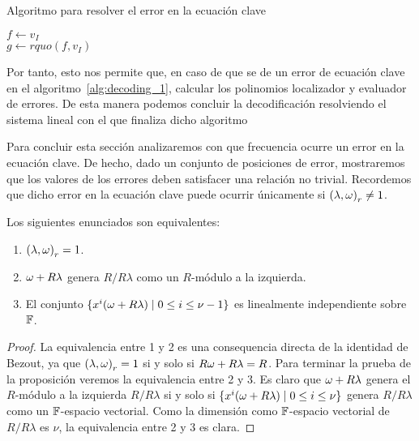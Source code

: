 \begin{algorithm}[H]
 \label{alg:failure_solver}
 \caption{Algoritmo para resolver el error en la ecuación clave}
 \(f \gets v_I\)\\
\(g \gets rquo(f, v_I)\)\\
\end{algorithm}

Por tanto, esto nos permite que, en caso de que se de un error de ecuación clave en el algoritmo~\ref{alg:decoding_1}, calcular los polinomios localizador y evaluador de errores. De esta manera podemos concluir la decodificación resolviendo el sistema lineal con el que finaliza dicho algoritmo

Para concluir esta sección analizaremos con que frecuencia ocurre un error en la ecuación clave. De hecho, dado un conjunto de posiciones de error, mostraremos que los valores de los errores deben satisfacer una relación no trivial. Recordemos que dicho error en la ecuación clave puede ocurrir únicamente si \({(\lambda, \omega)}_r \neq 1\).

\begin{proposition}
    Los siguientes enunciados son equivalentes:
    \begin{enumerate}
        \item \({(\lambda, \omega)}_r = 1\).
        \item \(\omega + R\lambda\) genera  \(R / R\lambda\) como un \(R\)-módulo a la izquierda.
        \item El conjunto \( \{x^{i}(\omega + R\lambda)  \mid 0 \le i \le \nu -1\}\) es linealmente independiente sobre \(\mathbb{F}\).
    \end{enumerate}
\end{proposition}
\begin{proof}
    La equivalencia entre 1 y 2 es una consequencia directa de la identidad de Bezout, ya que \({(\lambda, \omega)}_r = 1\) si y solo si \(R\omega + R\lambda = R\). Para terminar la prueba de la proposición veremos la equivalencia entre 2 y 3. Es claro que \(\omega + R\lambda\) genera el \(R\)-módulo a la izquierda \(R / R\lambda\) si y solo si  \( \{x^{i}(\omega + R\lambda)  \mid 0 \le i \le \nu\} \) genera \(R / R\lambda\) como un  \(\mathbb{F}\)-espacio vectorial. Como la dimensión como \(\mathbb{F}\)-espacio vectorial de \(R / R\lambda\) es \(\nu\), la equivalencia entre 2 y 3 es clara.
\end{proof}

